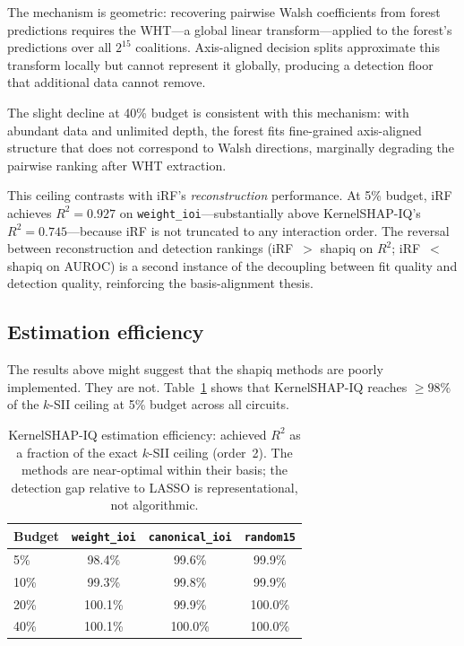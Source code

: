\documentclass[11pt]{article}
\begin{document}
The mechanism is geometric: recovering pairwise Walsh coefficients
from forest predictions requires the WHT---a global linear
transform---applied to the forest's predictions over all $2^{15}$
coalitions. Axis-aligned decision splits approximate this transform
locally but cannot represent it globally, producing a detection floor
that additional data cannot remove.

The slight decline at 40\% budget is consistent with this mechanism:
with abundant data and unlimited depth, the forest fits fine-grained
axis-aligned structure that does not correspond to Walsh directions,
marginally degrading the pairwise ranking after WHT extraction.

This ceiling contrasts with iRF's \emph{reconstruction} performance.
At 5\% budget, iRF achieves $R^2 = 0.927$ on
\texttt{weight\_ioi}---substantially above KernelSHAP-IQ's
$R^2 = 0.745$---because iRF is not truncated to any interaction
order. The reversal between reconstruction and detection rankings
(iRF~$>$ shapiq on $R^2$; iRF~$<$ shapiq on AUROC) is a second
instance of the decoupling between fit quality and detection quality,
reinforcing the basis-alignment thesis.


\subsection{Estimation efficiency}
\label{sec:efficiency}

The results above might suggest that the shapiq methods are poorly
implemented. They are not. Table~\ref{tab:efficiency} shows that
KernelSHAP-IQ reaches $\geq 98\%$ of the $k$-SII ceiling at 5\%
budget across all circuits.

\begin{table}[t]
\centering
\caption{KernelSHAP-IQ estimation efficiency: achieved $R^2$ as a
fraction of the exact $k$-SII ceiling (order~2). The methods are
near-optimal within their basis; the detection gap relative to
LASSO is representational, not algorithmic.}
\label{tab:efficiency}
\begin{tabular}{lccc}
\toprule
Budget & \texttt{weight\_ioi} & \texttt{canonical\_ioi} & \texttt{random15} \\
\midrule
5\%  & 98.4\% & 99.6\% & 99.9\% \\
10\% & 99.3\% & 99.8\% & 99.9\% \\
20\% & 100.1\% & 99.9\% & 100.0\% \\
40\% & 100.1\% & 100.0\% & 100.0\% \\
\bottomrule
\end{tabular}
\end{table}
\end{document}
